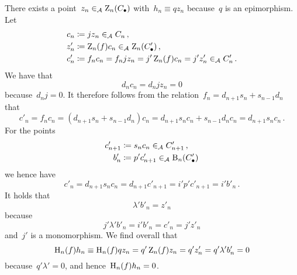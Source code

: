 There exists a point~$z_n \in_{\mathcal{A}} \operatorname{Z}_n(C_\bullet)$ with~$h_n \equiv q z_n$ because~$q$ is an epimorphism.
Let
\begin{align*}
            c_n
  &\coloneqq j z_n
  \in_{\mathcal{A}}      C_n \,,
  \\
            z'_n
  &\coloneqq \operatorname{Z}_n(f) c_n
  \in_{\mathcal{A}}      \operatorname{Z}_n(C_\bullet')  \,,
  \\
            c'_n
  &\coloneqq f_n c_n = f_n j z_n = j' \operatorname{Z}_n(f) c_n = j' z'_n
  \in_{\mathcal{A}}      C'_n \,.
\end{align*}
We have that
\[
    d_n c_n
  = d_n j z_n
  = 0
\]
because~$d_n j = 0$.
It therefore follows from the relation~$f_n = d_{n+1} s_n + s_{n-1} d_n$ that
\[
    c'_n
  = f_n c_n
  = (d_{n+1} s_n + s_{n-1} d_n) c_n
  = d_{n+1} s_n c_n + s_{n-1} d_n c_n
  = d_{n+1} s_n c_n \,.
\]
For the points
\begin{align*}
  c'_{n+1}  &\coloneqq s_n c_n \in_{\mathcal{A}} C'_{n+1} \,, \\
  b'_n      &\coloneqq p' c'_{n+1} \in_{\mathcal{A}} \operatorname{B}_n(C_\bullet')
\end{align*}
we hence have
\[
    c'_n
  = d_{n+1} s_n c_n
  = d_{n+1} c'_{n+1}
  = i' p' c'_{n+1}
  = i' b'_n \,.
\]
It holds that
\[
    \lambda' b'_n
  = z'_n
\]
because
\[
    j' \lambda' b'_n
  = i' b'_n
  = c'_n
  = j' z'_n
\]
and~$j'$ is a monomorphism.
We find overall that
\[
          \operatorname{H}_n(f) h_n
  \equiv  \operatorname{H}_n(f) q z_n
  =       q' \operatorname{Z}_n(f) z_n
  =       q' z'_n
  =       q' \lambda' b'_n
  =       0
\]
because~$q' \lambda' = 0$, and hence~$\operatorname{H}_n(f) h_n = 0$.
